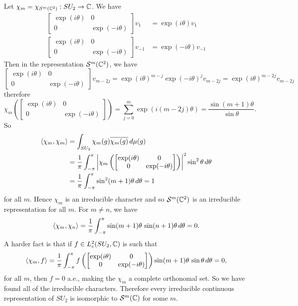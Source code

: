 \begin{exam}[$SU_2$]
  Let $\chi_m = \chi_{\mathcal{S}^m(\mathbb{C}^2)}: SU_2 \to \mathbb{C}$.
  We have
  \begin{align*}
    \begin{bmatrix}
      \exp(i\theta) & 0 \\ 0 & \exp(-i\theta)
    \end{bmatrix}
    v_1 &= \exp(i\theta) v_1 \\
    \begin{bmatrix}
      \exp(i\theta) & 0 \\ 0 & \exp(-i\theta)
    \end{bmatrix}
    v_{-1} &= \exp(-i\theta) v_{-1}
  \end{align*}
  Then in the representation $\mathcal{S}^m(\mathbb{C}^2)$, we have
  \begin{equation*}
    \begin{bmatrix}
      \exp(i\theta) & 0 \\ 0 & \exp(-i\theta)
    \end{bmatrix}
    v_{m-2j} = \exp(i\theta)^{m-j} \exp(-i\theta)^j v_{m-2j} = \exp(i\theta)^{m-2j} v_{m-2j}
  \end{equation*}
  therefore
  \begin{equation*}
    \chi_m \left(
    \begin{bmatrix}
      \exp(i\theta) & 0 \\ 0 & \exp(-i\theta)
    \end{bmatrix}
  \right) = \sum_{j=0}^m \exp(i(m-2j)\theta) = \frac{\sin(m+1)\theta}{\sin\theta}.
  \end{equation*}
  So
  \begin{align*}
    {\left\langle \chi_m,\chi_m \right\rangle} &= \int_{SU_2} \chi_m(g) \overline{\chi_m(g)} \, d\mu(g) \\
    &= \frac 1\pi \int_{-\pi}^\pi \left\lvert 
      \chi_m \left( 
      \begin{bmatrix}
	\exp(i\theta) & 0 \\ 0 & \exp(-i\theta)
      \end{bmatrix}
      \right)
     \right\rvert^2 \sin^2\theta \, d\theta \\
    &= \frac 1\pi \int_{-\pi}^\pi \sin^2(m+1)\theta \, d\theta = 1
  \end{align*}
  for all $m$.
  Hence $\chi_m$ is an irreducible character and so $\mathcal{S}^m(\mathbb{C}^2)$ is an irreducible representation for all $m$.
  For $m \neq n$, we have
  \[ {\left\langle \chi_m,\chi_n \right\rangle} = \frac 1\pi \int_{-\pi}^\pi \sin(m+1)\theta \, \sin(n+1)\theta \, d\theta = 0. \]
  A harder fact is that if $f \in L^2_c(SU_2,\mathbb{C})$ is such that
  \[ {\left\langle \chi_m,f \right\rangle} = \frac 1\pi \int_{-\pi}^\pi f \left( 
    \begin{bmatrix}
      \exp(i\theta) & 0 \\ 0 & \exp(-i\theta)
    \end{bmatrix}
  \right) \sin(m+1)\theta \, \sin\theta \, d\theta = 0, \]
  for all $m$, then $f=0$ a.e., making the $\chi_m$ a complete orthonomal set.
  So we have found all of the irreducible characters.
  Therefore every irreducible continuous representation of $SU_2$ is isomorphic to $\mathcal{S}^m(\mathbb{C})$ for some $m$.
\end{exam}

